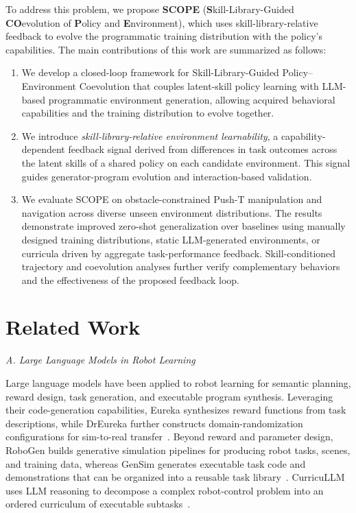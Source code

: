 \documentclass[conference]{IEEEtran}
\begin{document}
To address this problem, we propose \textbf{SCOPE}
(\textbf{S}kill-Library-Guided \textbf{CO}evolution of \textbf{P}olicy and
\textbf{E}nvironment), which uses skill-library-relative feedback to evolve the
programmatic training distribution with the policy's capabilities. The main
contributions of this work are summarized as follows:
\begin{enumerate}
    \item We develop a closed-loop framework for
    Skill-Library-Guided Policy--Environment Coevolution that couples
    latent-skill policy learning with LLM-based programmatic environment
    generation, allowing acquired behavioral capabilities and the training
    distribution to evolve together.

    \item We introduce \emph{skill-library-relative environment learnability},
    a capability-dependent feedback signal derived from differences in task
    outcomes across the latent skills of a shared policy on each candidate
    environment. This signal guides generator-program evolution and
    interaction-based validation.

    \item We evaluate SCOPE on obstacle-constrained Push-T manipulation and
    navigation across diverse unseen environment distributions. The results
    demonstrate improved zero-shot generalization over baselines using manually
    designed training distributions, static LLM-generated environments, or
    curricula driven by aggregate task-performance feedback. Skill-conditioned
    trajectory and coevolution analyses further verify complementary behaviors
    and the effectiveness of the proposed feedback loop.
\end{enumerate}

\section{Related Work}
\textit{A. Large Language Models in Robot Learning}

Large language models have been applied to robot learning for semantic
planning, reward design, task generation, and executable program synthesis.
Leveraging their code-generation capabilities, Eureka synthesizes reward
functions from task descriptions, while DrEureka further constructs
domain-randomization configurations for sim-to-real
transfer~\cite{eureka,dreureka}. Beyond reward and parameter design, RoboGen
builds generative simulation pipelines for producing robot tasks, scenes, and
training data, whereas GenSim generates executable task code and demonstrations
that can be organized into a reusable task library~\cite{robogen,gensim}.
CurricuLLM uses LLM reasoning to decompose a complex robot-control problem into
an ordered curriculum of executable subtasks~\cite{curricullm}.
\end{document}
